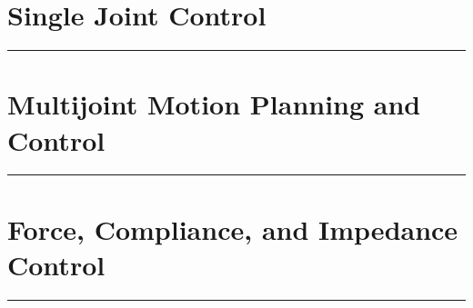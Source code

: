 \documentclass[
11pt, %
a4paper, %
oneside, %
headinclude,footinclude, %
BCOR5mm, %
]{scrartcl}
\begin{document}
\section{Single Joint Control}
\hrule
\vspace{0.5cm}
\newpage

\section{Multijoint Motion Planning and Control}
\hrule
\vspace{0.5cm}
\newpage

\section{Force, Compliance, and Impedance Control}
\hrule
\vspace{0.5cm}
\end{document}
